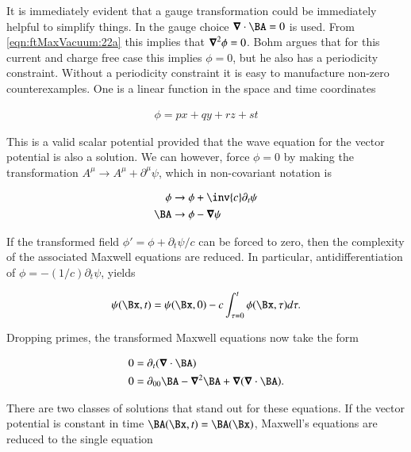 It is immediately evident that a gauge transformation could be immediately helpful to simplify things.  In \citep{bohm1989qt} the gauge choice $\spacegrad \cdot \BA = 0$ is used.  From \autoref{eqn:ftMaxVacuum:22a} this implies that $\boldsymbol{\nabla}^2 \phi = 0$.  Bohm argues that for this current and charge free case this implies $\phi = 0$, but he also has a periodicity constraint.  Without a periodicity constraint it is easy to manufacture non-zero counterexamples.  One is a linear function in the space and time coordinates

\begin{align}
\label{eqn:ftMaxVacuum:23}
\phi = p x + q y + r z + s t
\end{align}

This is a valid scalar potential provided that the wave equation for the vector potential is also a solution.  We can however, force $\phi = 0$ by making the transformation $A^\mu \rightarrow A^\mu + \partial^\mu \psi$, which in non-covariant notation is

\begin{align}
\label{eqn:ftMaxVacuum:24}
\phi &\rightarrow \phi + \inv{c} \partial_t \psi \\
\BA &\rightarrow \phi - \spacegrad \psi
\end{align}

If the transformed field $\phi' = \phi + \partial_t \psi/c$ can be forced to zero, then the complexity of the associated Maxwell equations are reduced.  In particular, antidifferentiation of $\phi = -(1/c) \partial_t \psi$, yields

\begin{align}
\label{eqn:ftMaxVacuum:25}
\psi(\Bx,t) = \psi(\Bx, 0) - c \int_{\tau=0}^t \phi(\Bx, \tau) d\tau.
\end{align}

Dropping primes, the transformed Maxwell equations now take the form

\begin{subequations}
\label{eqn:ftMaxVacuum:26}
\begin{align}
0 &= \partial_t( \spacegrad \cdot \BA )
\label{eqn:ftMaxVacuum:26a}
\\
0 &=
\partial_{00} \BA - \spacegrad^2 \BA + \spacegrad (\spacegrad \cdot \BA ).
\label{eqn:ftMaxVacuum:26b}
\end{align}
\end{subequations}

There are two classes of solutions that stand out for these equations.  If the vector potential is constant in time $\BA(\Bx,t) = \BA(\Bx)$, Maxwell's equations are reduced to the single equation

